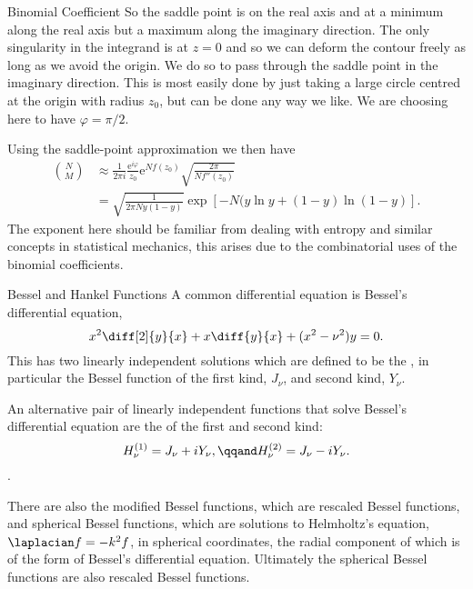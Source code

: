 \documentclass[fleqn]{NotesClass}
\newcommand*{\e}{\mathrm{e}}
\begin{document}
\begin{exm}{Binomial Coefficient}{}
        So the saddle point is on the real axis and at a minimum along the real axis but a maximum along the imaginary direction.
        The only singularity in the integrand is at \(z = 0\) and so we can deform the contour freely as long as we avoid the origin.
        We do so to pass through the saddle point in the imaginary direction.
        This is most easily done by just taking a large circle centred at the origin with radius \(z_0\), but can be done any way we like.
        We are choosing here to have \(\varphi = \pi/2\).
        
        Using the saddle-point approximation we then have
        \begin{align}
            \binom{N}{M} &\approx \frac{1}{2\pi i} \frac{\e^{i\varphi}}{z_0} \e^{Nf(z_0)} \sqrt{\frac{2\pi}{Nf''(z_0)}}\\
            &= \sqrt{\frac{1}{2\pi Ny(1 - y)}} \exp[-N(y\ln y + (1 - y)\ln(1 - y)].
        \end{align}
        The exponent here should be familiar from dealing with entropy and similar concepts in statistical mechanics, this arises due to the combinatorial uses of the binomial coefficients.
    \end{exm}
    
    \begin{dfn}{Bessel and Hankel Functions}{}
        A common differential equation is Bessel's differential equation,
        \begin{equation}
            x^2\diff[2]{y}{x} + x\diff{y}{x} + (x^2 - \nu^2)y = 0.
        \end{equation}
        This has two linearly independent solutions which are defined to be the , in particular the Bessel function of the first kind, \(J_\nu\), and second kind, \(Y_\nu\).
        
        An alternative pair of linearly independent functions that solve Bessel's differential equation are the  of the first and second kind:
        \begin{equation}
            H_\nu^{(1)} = J_\nu + iY_\nu, \qqand H_{\nu}^{(2)} = J_\nu - iY_\nu.
        \end{equation}
        .
        
        There are also the modified Bessel functions, which are rescaled Bessel functions, and spherical Bessel functions, which are solutions to Helmholtz's equation, \(\laplacian f = -k^2f\), in spherical coordinates, the radial component of which is of the form of Bessel's differential equation.
        Ultimately the spherical Bessel functions are also rescaled Bessel functions.
    \end{dfn}
    
\end{document}
